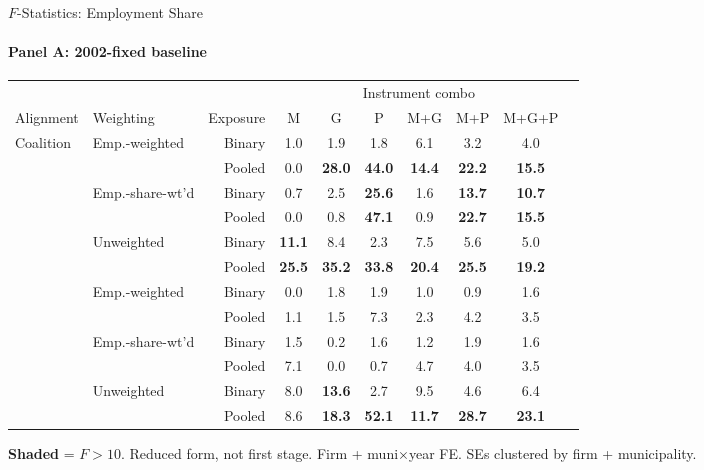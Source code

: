 \documentclass[aspectratio=169,10pt]{beamer}
\newcommand{\fpass}[1]{\cellcolor{pass}\textbf{#1}}
\begin{document}
\begin{frame}[t]{$F$-Statistics: Employment Share}
\framesubtitle{Panel A: 2002-fixed baseline}
\begin{center}
\footnotesize
\setlength{\tabcolsep}{3.5pt}
\renewcommand{\arraystretch}{1.05}
\begin{tabular}{@{}llrccccccc@{}}
\toprule
 & & & \multicolumn{6}{c}{Instrument combo} \\
\cmidrule(l{2pt}r{2pt}){4-9}
Alignment & Weighting & Exposure & M & G & P & M+G & M+P & M+G+P \\
\midrule
  \multirow{6}{*}{Coalition} & \multirow{2}{*}{Emp.-weighted} & Binary & 1.0 & 1.9 & 1.8 & 6.1 & 3.2 & 4.0 \\
   &  & Pooled & 0.0 & \fpass{28.0} & \fpass{44.0} & \fpass{14.4} & \fpass{22.2} & \fpass{15.5} \\
   & \multirow{2}{*}{Emp.-share-wt'd} & Binary & 0.7 & 2.5 & \fpass{25.6} & 1.6 & \fpass{13.7} & \fpass{10.7} \\
   &  & Pooled & 0.0 & 0.8 & \fpass{47.1} & 0.9 & \fpass{22.7} & \fpass{15.5} \\
   & \multirow{2}{*}{Unweighted} & Binary & \fpass{11.1} & 8.4 & 2.3 & 7.5 & 5.6 & 5.0 \\
   &  & Pooled & \fpass{25.5} & \fpass{35.2} & \fpass{33.8} & \fpass{20.4} & \fpass{25.5} & \fpass{19.2} \\
\addlinespace[5pt]
  \multirow{6}{*}{Party} & \multirow{2}{*}{Emp.-weighted} & Binary & 0.0 & 1.8 & 1.9 & 1.0 & 0.9 & 1.6 \\
   &  & Pooled & 1.1 & 1.5 & 7.3 & 2.3 & 4.2 & 3.5 \\
   & \multirow{2}{*}{Emp.-share-wt'd} & Binary & 1.5 & 0.2 & 1.6 & 1.2 & 1.9 & 1.6 \\
   &  & Pooled & 7.1 & 0.0 & 0.7 & 4.7 & 4.0 & 3.5 \\
   & \multirow{2}{*}{Unweighted} & Binary & 8.0 & \fpass{13.6} & 2.7 & 9.5 & 4.6 & 6.4 \\
   &  & Pooled & 8.6 & \fpass{18.3} & \fpass{52.1} & \fpass{11.7} & \fpass{28.7} & \fpass{23.1} \\
\bottomrule
\end{tabular}
\end{center}
{\scriptsize \colorbox{pass}{\textbf{Shaded}} = $F>10$. \textcolor{alertred}{Reduced form, not first stage.} Firm + muni$\times$year FE. SEs clustered by firm + municipality.}
\end{frame}
\end{document}
